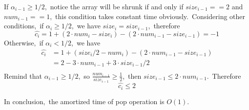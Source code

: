 \documentclass[]{article}
\begin{document}
    If $\alpha_{i-1}\geq 1/2$,\ notice the array will be shrunk if and only if $size_{i-1} == 2$ and $num_{i-1} == 1$,\ this condition takes constant time obviously.\ Considering other conditions,\ if $\alpha_{i}\geq 1/2$,\ we have $size_i = size_{i-1}$,\ therefore
    \begin{equation*}
    \hat{c_i} = 1 + (2\cdot num_i - size_i) - (2\cdot num_{i-1} - size_{i-1}) = -1
    \end{equation*}
    Otherwise,\ if $\alpha_i< 1/2$,\ we have
    \begin{equation*}
    \begin{aligned}
    \hat{c_i} &= 1 + (size_i/2 - num_i) - (2\cdot num_{i-1} - size_{i-1})\\
    &= 2 - 3\cdot num_{i-1} + 3\cdot size_{i-1}/2\\
    \end{aligned}
    \end{equation*}
    Remind that $\alpha_{i-1}\geq 1/2$,\ so $\frac{num_{i-1}}{size_{i-1}}\geq \frac{1}{2}$,\ then $size_{i-1}\leq 2\cdot num_{i-1}$.\ Therefore
    \begin{equation*}
    \hat{c_i} \leq 2
    \end{equation*}
    
    In conclusion,\ the amortized time of pop operation is $O(1)$.
\end{document}
